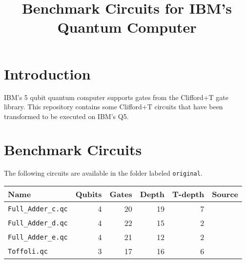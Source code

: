 \documentclass{article}
\begin{document}
\title{Benchmark Circuits for IBM's Quantum Computer}
\date{}
\maketitle

\section{Introduction}
IBM's 5 qubit quantum computer \cite{IBMQ} supports gates from the Clifford+T gate library. 
This repository contains some  Clifford+T circuits that have been transformed to be executed on IBM's Q5.

\section{Benchmark Circuits}

The following circuits are available in the folder labeled {\tt original}.
\vspace{5mm}

\begin{tabular}{|l|r|r|r|r|c|}
   \hline
   Name & Qubits & Gates & Depth & T-depth & Source \\ \hline  \hline
   {\tt Full\_Adder\_c.qc} & 4 & 20 & 19 & 7 & \cite{DBLP:conf/rc/MillerSD14}  \\  \hline
   {\tt Full\_Adder\_d.qc} & 4 & 22 & 15 & 2 & \cite{DBLP:conf/rc/MillerSD14}  \\  \hline
   {\tt Full\_Adder\_e.qc} & 4 & 21 & 12 & 2 & \cite{DBLP:conf/rc/MillerSD14}  \\  \hline
   {\tt Toffoli.qc} & 3 & 17 & 16 & 6 &   \\  \hline
  \end{tabular} 



 
\end{document}
